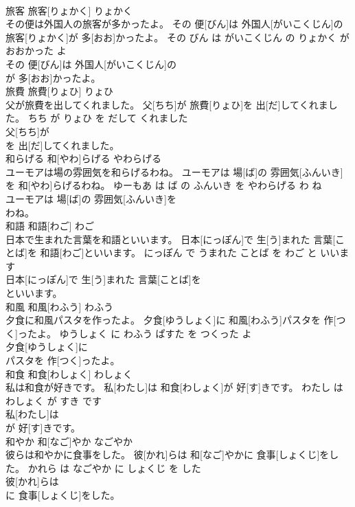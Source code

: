 \documentclass[8pt]{extreport}
\begin{document}
\begin{CJK}{UTF8}{min}
\\	旅客	旅客[りょかく]	りょかく	
\\	その便は外国人の旅客が多かったよ。	その 便[びん]は 外国人[がいこくじん]の 旅客[りょかく]が 多[おお]かったよ。	その びん は がいこくじん の りょかく が おおかった よ	
\\	その 便[びん]は 外国人[がいこくじん]の
\\	が 多[おお]かったよ。			
\\	旅費	旅費[りょひ]	りょひ	
\\	父が旅費を出してくれました。	父[ちち]が 旅費[りょひ]を 出[だ]してくれました。	ちち が りょひ を だして くれました	
\\	父[ちち]が
\\	を 出[だ]してくれました。			
\\	和らげる	和[やわ]らげる	やわらげる	
\\	ユーモアは場の雰囲気を和らげるわね。	ユーモアは 場[ば]の 雰囲気[ふんいき]を 和[やわ]らげるわね。	ゆーもあ は ば の ふんいき を やわらげる わ ね	
\\	ユーモアは 場[ば]の 雰囲気[ふんいき]を
\\	わね。			
\\	和語	和語[わご]	わご	
\\	日本で生まれた言葉を和語といいます。	日本[にっぽん]で 生[う]まれた 言葉[ことば]を 和語[わご]といいます。	にっぽん で うまれた ことば を わご と いいます	
\\	日本[にっぽん]で 生[う]まれた 言葉[ことば]を
\\	といいます。			
\\	和風	和風[わふう]	わふう	
\\	夕食に和風パスタを作ったよ。	夕食[ゆうしょく]に 和風[わふう]パスタを 作[つく]ったよ。	ゆうしょく に わふう ぱすた を つくった よ	
\\	夕食[ゆうしょく]に
\\	パスタを 作[つく]ったよ。			
\\	和食	和食[わしょく]	わしょく	
\\	私は和食が好きです。	私[わたし]は 和食[わしょく]が 好[す]きです。	わたし は わしょく が すき です	
\\	私[わたし]は
\\	が 好[す]きです。			
\\	和やか	和[なご]やか	なごやか	
\\	彼らは和やかに食事をした。	彼[かれ]らは 和[なご]やかに 食事[しょくじ]をした。	かれら は なごやか に しょくじ を した	
\\	彼[かれ]らは
\\	に 食事[しょくじ]をした。			

\end{CJK}
\end{document}
